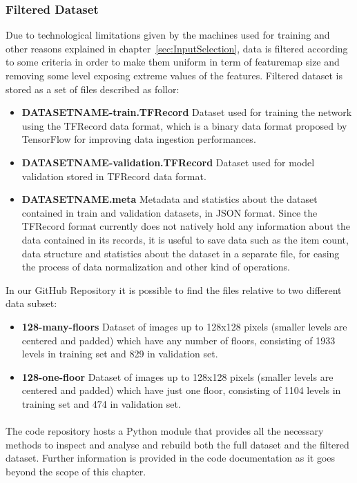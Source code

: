  
 \subsubsection{Filtered Dataset} Due to technological limitations given by the machines used for training and other reasons explained in chapter~\ref{sec:InputSelection}, data is filtered according to some criteria in order to make them uniform in term of \gls{featuremap} size and removing some level exposing extreme values of the features. Filtered dataset is stored as a set of files described as follor:
 	\begin{itemize}
		\item \textbf{DATASETNAME-train.TFRecord} Dataset used for training the network using the TFRecord data format, which is a binary data format proposed by TensorFlow for improving data ingestion performances. 
		\item \textbf{DATASETNAME-validation.TFRecord}  Dataset used for model validation stored in TFRecord data format.
		\item \textbf{DATASETNAME.meta} Metadata and statistics about the dataset contained in train and validation datasets, in JSON format. Since the TFRecord format currently does not natively hold any information about the data contained in its records, it is useful to save data such as the item count, data structure and statistics about the dataset in a separate file, for easing the process of data normalization and other kind of operations.
 	\end{itemize}
 \label{sec:metadata_tfrecord}
 
 In our GitHub Repository \cite{gitrepo} it is possible to find the files relative to two different data subset:
 \begin{itemize}
 	\item \textbf{128-many-floors} Dataset of images up to 128x128 pixels (smaller levels are centered and padded) which have any number of floors, consisting of 1933 levels in training set and 829 in validation set. 
 	\item \textbf{128-one-floor} Dataset of images up to 128x128 pixels (smaller levels are centered and padded) which have just one floor, consisting of 1104 levels in training set and 474 in validation set.
 	
 \end{itemize}
	\paragraph{} The code repository \cite{gitrepo} hosts a Python module that provides all the necessary methods to inspect and analyse and rebuild both the full dataset and the filtered dataset. Further information is provided in the code documentation as it goes beyond the scope of this chapter.
	
